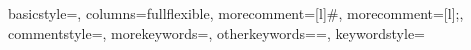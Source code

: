 \usepackage[german]{babel}
\usepackage[T1]{fontenc} %
\usepackage[utf8x]{inputenc}
\usepackage{amsmath}
\usepackage{graphicx}
\usepackage[colorinlistoftodos]{todonotes}
\usepackage{dirtree}
\usepackage{nameref}
\usepackage{listings}
\usepackage{tabularx}

\usepackage{textcomp}
\usepackage{hyperref}
\usepackage{amssymb}
\providecommand\meta[1]{\textlangle{\itshape #1\/}\textrangle}

{
basicstyle=\ttfamily\small,
columns=fullflexible,
morecomment=[l]{\#},
morecomment=[l]{;},
commentstyle=\color{gray}\ttfamily,
morekeywords={},
otherkeywords={=},
keywordstyle={\color{green}\bfseries}
}

\graphicspath{ {../common/} }
